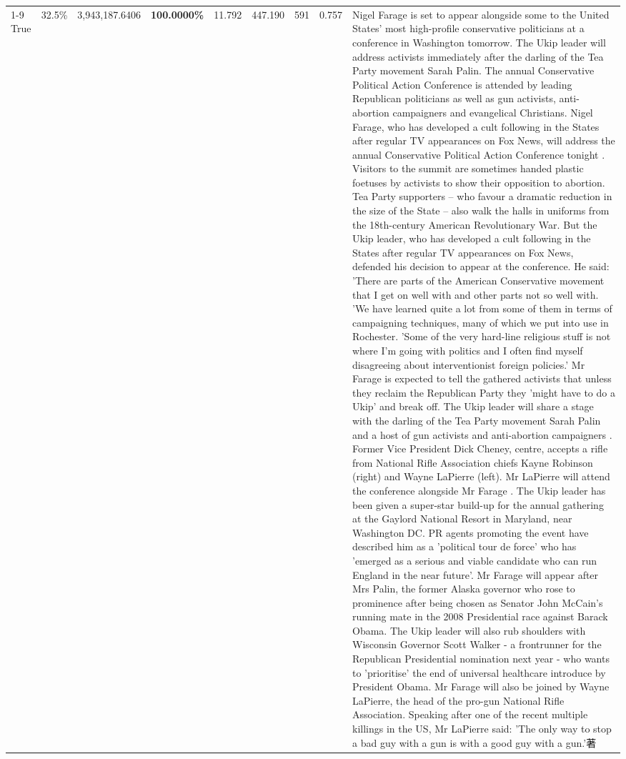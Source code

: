 \begin{table}[H]
\begin{tabular}{lllrlllll}
\cline{1-9}
True & 32.5\% & 3,943,187.6406 & \bfseries \color{red} 100.0000\% & 11.792 & 447.190 & 591 & 0.757 & Nigel Farage is set to appear alongside some to the United States' most high-profile conservative politicians at a conference in Washington tomorrow. The Ukip leader will address activists immediately after the darling of the Tea Party movement Sarah Palin. The annual Conservative Political Action Conference is attended by leading Republican politicians as well as gun activists, anti-abortion campaigners and evangelical Christians. Nigel Farage, who has developed a cult following in the States after regular TV appearances on Fox News, will address the annual Conservative Political Action Conference tonight . Visitors to the summit are sometimes handed plastic foetuses by activists to show their opposition to abortion. Tea Party supporters – who favour a dramatic reduction in the size of the State – also walk the halls in uniforms from the 18th-century American Revolutionary War. But the Ukip leader, who has developed a cult following in the States after regular TV appearances on Fox News, defended his decision to appear at the conference. He said: 'There are parts of the American Conservative movement that I get on well with and other parts not so well with. 'We have learned quite a lot from some of them in terms of campaigning techniques, many of which we put into use in Rochester. 'Some of the very hard-line religious stuff is not where I'm going with politics and I often find myself disagreeing about interventionist foreign policies.' Mr Farage is expected to tell the gathered activists that unless they reclaim the Republican Party they 'might have to do a Ukip' and break off. The Ukip leader will share a stage with the darling of the Tea Party movement Sarah Palin and a host of gun activists and anti-abortion campaigners . Former Vice President Dick Cheney, centre, accepts a rifle from National Rifle Association chiefs Kayne Robinson (right) and Wayne LaPierre (left). Mr LaPierre will attend the conference alongside Mr Farage . The Ukip leader has been given a super-star build-up for the annual gathering at the Gaylord National Resort in Maryland, near Washington DC. PR agents promoting the event have described him as a 'political tour de force' who has 'emerged as a serious and viable candidate who can run England in the near future'. Mr Farage will appear after Mrs Palin, the former Alaska governor who rose to prominence after being chosen as Senator John McCain's running mate in the 2008 Presidential race against Barack Obama. The Ukip leader will also rub shoulders with Wisconsin Governor Scott Walker - a frontrunner for the Republican Presidential nomination next year - who wants to 'prioritise' the end of universal healthcare introduce by President Obama. Mr Farage will also be joined by Wayne LaPierre, the head of the pro-gun National Rifle Association. Speaking after one of the recent multiple killings in the US, Mr LaPierre said: 'The only way to stop a bad guy with a gun is with a good guy with a gun.'著 \\

\end{tabular}
\end{table}
